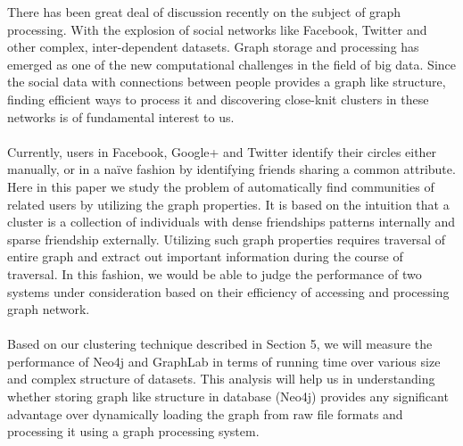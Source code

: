 \documentclass[11pt,onecolumn]{article}
\begin{document}
There has been great deal of discussion recently on the subject of graph processing. With the explosion of social networks like Facebook, Twitter and other complex, inter-dependent datasets. Graph storage and processing has emerged as one of the new computational challenges in the field of big data. Since the social data with connections between people provides a graph like structure, finding efficient ways to process it and discovering close-knit clusters in these networks is of fundamental interest to us.
\\\\
Currently, users in Facebook, Google+ and Twitter identify their circles either manually, or in a naïve fashion by identifying friends sharing a common attribute. Here in this paper we study the problem of automatically find communities of related users by utilizing the graph properties. It is based on the intuition that a cluster is a collection of individuals with dense friendships patterns internally and sparse friendship externally. Utilizing such graph properties requires traversal of entire graph and extract out important information during the course of traversal. In this fashion, we would be able to judge the performance of two systems under consideration based on their efficiency of accessing and processing graph network. 
\\\\
Based on our clustering technique described in Section 5, we will measure the performance of Neo4j and GraphLab in terms of running time over various size and complex structure of datasets. This analysis will help us in understanding whether storing graph like structure in database (Neo4j) provides any significant advantage over dynamically loading the graph from raw file formats and processing it using a graph processing system.
\end{document}
